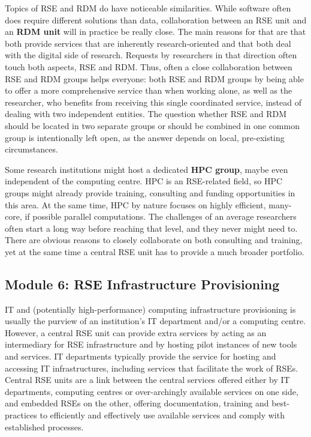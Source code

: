 \documentclass[a4paper]{article}
\begin{document}
Topics of RSE and RDM do have noticeable similarities.
While software often does require different solutions than data, collaboration between an RSE unit and an \textbf{RDM unit} will in practice be really close.
The main reasons for that are that both provide services that are inherently research-oriented and that both deal with the digital side of research.
Requests by researchers in that direction often touch both aspects, RSE and RDM\@.
Thus, often a close collaboration between RSE and RDM groups helps everyone: both RSE and RDM groups by being able to offer a more comprehensive service than when working alone, as well as the researcher, who benefits from receiving this single coordinated service, instead of dealing with two independent entities.
The question whether RSE and RDM should be located in two separate groups or should be combined in one common group is intentionally left open, as the answer depends on local, pre-existing circumstances.

Some research institutions might host a dedicated \textbf{HPC group}, maybe even independent of the computing centre.
HPC is an RSE-related field, so HPC groups might already provide training, consulting and funding opportunities in this area.
At the same time, HPC by nature focuses on highly efficient, many-core, if possible parallel computations.
The challenges of an average researchers often start a long way before reaching that level, and they never might need to.
There are obvious reasons to closely collaborate on both consulting and training, yet at the same time a central RSE unit has to provide a much broader portfolio.

\subsection{Module 6: RSE Infrastructure Provisioning}%
\label{sec:infrastructure}

IT and (potentially high-performance) computing infrastructure provisioning is usually the purview of an institution's IT department and/or a computing centre.
However, a central RSE unit can provide extra services by acting as an intermediary for RSE infrastructure and by hosting pilot instances of new tools and services.
IT departments typically provide the service for hosting and accessing IT infrastructures, including services that facilitate the work of RSEs.
Central RSE units are a link between the central services offered either by IT departments, computing centres or over-archingly available services on one side,
and embedded RSEs on the other, offering documentation, training and best-practices to efficiently and effectively use available services and comply with established processes.
\end{document}
